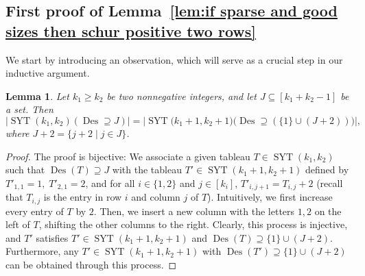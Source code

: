\documentclass[11pt]{article}
\newtheorem{lemma}[theo]{Lemma}
\theoremstyle{definition}
\numberwithin{equation}{section}
\newcommand{\Des}{\operatorname{Des}}
\newcommand{\Syt}{\operatorname{SYT}}
\begin{document}
\subsection{First proof of Lemma~\ref{lem:if sparse and good sizes then schur positive two rows}}
\label{subsec:proof if sparse and good sizes then schur positive two rows by induction}
We start by introducing an observation, which will serve as a crucial step in our inductive argument.
\begin{lemma}
\label{lem:remove first descent from syt}
    Let $k_1 \ge k_2$ be two nonnegative integers, and let $J \subseteq [k_1 + k_2 - 1]$ be a set. Then
    \[
        \left|\Syt(k_1, k_2)(\Des \supseteq J)\right| = \left|\Syt\big(k_1+1, k_2+1\big)\big(\Des \supseteq (\{1\}\cup (J+2))\big)\right|,
    \]
    where $J+2 = \{j + 2 \mid j \in J\}$.
\end{lemma}
\begin{proof}
    The proof is bijective: We associate a given tableau $T \in \Syt(k_1, k_2)$ such that $\Des(T) \supseteq J$ with the tableau $T' \in \Syt(k_1+1, k_2+1)$ defined by $T'_{1,1} = 1,\; T'_{2,1} = 2$, and for all $i \in \{1,2\}$ and $j \in [k_i]$, $T'_{i,j+1} = T_{i,j}+2$ (recall that $T_{i,j}$ is the entry in row $i$ and column $j$ of $T$). Intuitively, we first increase every entry of $T$ by $2$. Then, we insert a new column with the letters $1,2$ on the left of $T$, shifting the other columns to the right. Clearly, this process is injective, and $T'$ satisfies $T' \in \Syt(k_1+1, k_2+1)$ and $\Des(T) \supseteq \{1\}\cup (J+2)$. Furthermore, any $T' \in \Syt(k_1+1, k_2+1)$ with $\Des(T') \supseteq \{1\}\cup (J+2)$ can be obtained through this process.
\end{proof}
\end{document}
